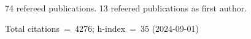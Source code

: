 74 refereed publications. 13 refeered publications as first author.

Total citations~=~4276; h-index~=~35 (2024-09-01)